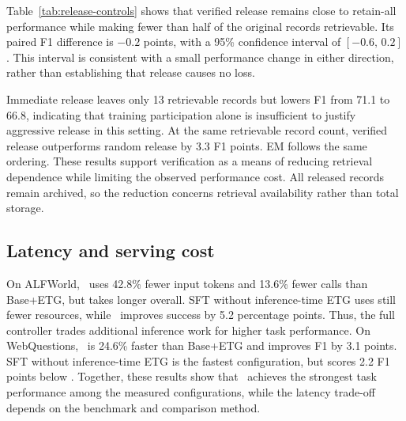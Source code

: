 Table~\ref{tab:release-controls} shows that verified release
remains close to retain-all performance while making
fewer than half of the original records retrievable.
Its paired F1 difference is $-0.2$ points, with a 95\%
confidence interval of $[-0.6,\,0.2]$.
This interval is consistent with a small performance
change in either direction, rather than establishing
that release causes no loss.

Immediate release leaves only 13 retrievable records
but lowers F1 from 71.1 to 66.8, indicating that training
participation alone is insufficient to justify aggressive
release in this setting.
At the same retrievable record count, verified release
outperforms random release by 3.3 F1 points.
EM follows the same ordering.
These results support verification as a means of reducing
retrieval dependence while limiting the observed
performance cost.
All released records remain archived, so the reduction
concerns retrieval availability rather than total storage.


\vspace{-5pt}

\subsection{Latency and serving cost}
\label{sec:efficiency}

\vspace{-5pt}



On ALFWorld, \method\ uses 42.8\% fewer input tokens and 13.6\% fewer calls than Base+ETG, but takes longer overall. SFT without inference-time ETG uses still fewer resources, while \method\ improves success by 5.2 percentage points. Thus, the full controller trades additional inference work for higher task performance. On WebQuestions, \method\ is 24.6\% faster than Base+ETG and improves F1 by 3.1 points. SFT without inference-time ETG is the fastest configuration, but scores 2.2 F1 points below \method. Together, these results show that \method\ achieves the strongest task performance among the measured configurations, while the latency trade-off depends on the benchmark and comparison method.
